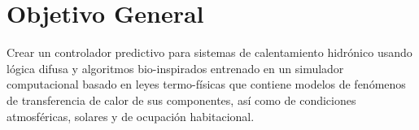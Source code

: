 \section{Objetivo General}

Crear un controlador predictivo para sistemas de calentamiento hidrónico usando lógica difusa y algoritmos bio-inspirados entrenado en un simulador computacional basado en leyes termo-físicas que contiene modelos de fenómenos de transferencia de calor de sus componentes, así como de condiciones atmosféricas, solares y de ocupación habitacional.
